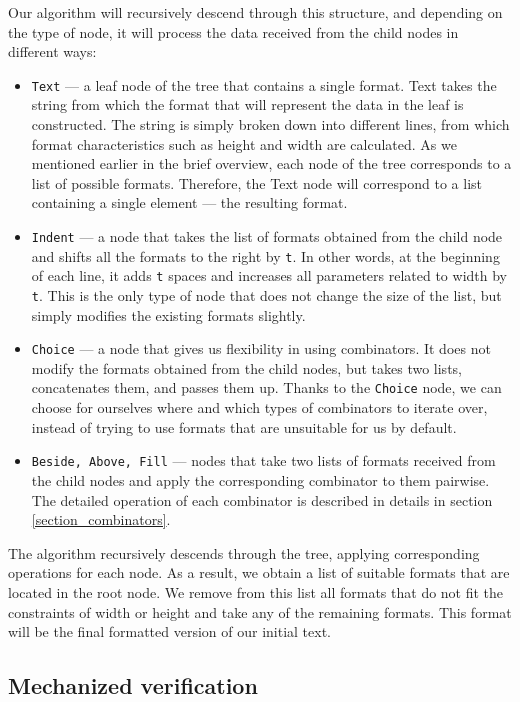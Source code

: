 \documentclass[14pt]{constructor-diploma}
\begin{document}
Our algorithm will recursively descend through this structure, 
and depending on the type of node, it will process the data received from the child nodes in different ways:
\begin{itemize}
  \item \texttt{Text} --- a leaf node of the tree that contains a single format.
    Text takes the string from which the format that will represent the data in the leaf is constructed. 
    The string is simply broken down into different lines, from which format characteristics such as height and width are calculated.
    As we mentioned earlier in the brief overview, each node of the tree corresponds to a list of possible formats. 
    Therefore, the Text node will correspond to a list containing a single element --- the resulting format.
  \item \texttt{Indent} --- a node that takes the list of formats obtained from the child node 
    and shifts all the formats to the right by \texttt{t}. In other words, 
    at the beginning of each line, it adds \texttt{t} spaces and increases all parameters related to width by \texttt{t}. 
    This is the only type of node that does not change the size of the list, but simply modifies the existing formats slightly.
  \item \texttt{Choice} --- a node that gives us flexibility in using combinators. 
    It does not modify the formats obtained from the child nodes, but takes two lists, 
    concatenates them, and passes them up. Thanks to the \texttt{Choice} node, 
    we can choose for ourselves where and which types of combinators to iterate over, 
    instead of trying to use formats that are unsuitable for us by default.
  \item \texttt{Beside, Above, Fill} --- nodes that take two lists of formats received from the child nodes 
    and apply the corresponding combinator to them pairwise. 
    The detailed operation of each combinator is described in details in section \ref{section_combinators}.
\end{itemize}

The algorithm recursively descends through the tree, applying corresponding operations for each node. 
As a result, we obtain a list of suitable formats that are located in the root node. 
We remove from this list all formats that do not fit the constraints of width or height 
and take any of the remaining formats. This format will be the final formatted version of our initial text.

\subsection{Mechanized verification}
\end{document}
